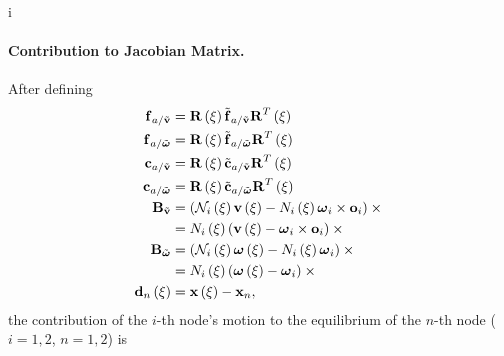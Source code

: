 i\paragraph{Contribution to Jacobian Matrix.}
After defining
\begin{subequations}
\begin{align}
	\T{f}_{a/\tilde{\T{v}}} &= \TT{R}\plbr{\xi} \tilde{\T{f}}_{a/\tilde{\T{v}}} \TT{R}^T\plbr{\xi} \\
	\T{f}_{a/\tilde{\T{\omega}}} &= \TT{R}\plbr{\xi} \tilde{\T{f}}_{a/\tilde{\T{\omega}}} \TT{R}^T\plbr{\xi} \\
	\T{c}_{a/\tilde{\T{v}}} &= \TT{R}\plbr{\xi} \tilde{\T{c}}_{a/\tilde{\T{v}}} \TT{R}^T\plbr{\xi} \\
	\T{c}_{a/\tilde{\T{\omega}}} &= \TT{R}\plbr{\xi} \tilde{\T{c}}_{a/\tilde{\T{\omega}}} \TT{R}^T\plbr{\xi} \\
	\TT{B}_{\tilde{\T{v}}} &= \plbr{
		\mathcal{N}_i\plbr{\xi} \T{v}\plbr{\xi}
		- N_i\plbr{\xi} \T{\omega}_i \times \T{o}_i
	} \times{}
	\nonumber \\
	&= N_i\plbr{\xi} \plbr{
		\T{v}\plbr{\xi}
		- \T{\omega}_i \times \T{o}_i
	} \times{}
	\\
	\TT{B}_{\tilde{\T{\omega}}} &= \plbr{
		\mathcal{N}_i\plbr{\xi} \T{\omega}\plbr{\xi}
		- N_i\plbr{\xi} \T{\omega}_i
	} \times{}
	\nonumber \\
	&= N_i\plbr{\xi} \plbr{
		\T{\omega}\plbr{\xi}
		- \T{\omega}_i
	} \times{}
	\\
	\T{d}_n\plbr{\xi} &= \T{x}\plbr{\xi} - \T{x}_n
	,
\end{align}
\end{subequations}
the contribution of the $i$-th node's motion to the equilibrium
of the $n$-th node ($i=1,2$, $n=1,2$) is
